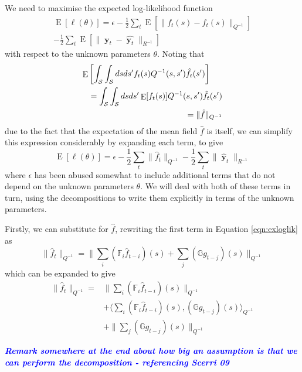 \documentclass{IEEEtran}
\newcommand{\todo}[1]{\textsf{\emph{\textbf{\textcolor{blue}{#1}}}}}
\newcommand{\inner}[3]{\langle#1,#2\rangle_{#3}}
\newcommand{\dist}[2]{\|#1\|_{#2}}
\DeclareMathOperator{\E}{E}
\DeclareMathOperator{\yvec}{\mathbf{y}}
\begin{document}
We need to maximise the expected log-likelihood function
\begin{equation}
	\begin{split}
	\E[\ell(\theta)] = \epsilon - \frac{1}{2}\sum_t\E[\dist{f_t(s) - \hat{f}_t(s)}{Q^{-1}}]  \\
	- \frac{1}{2}\sum_t\E[\dist{\yvec_t-\hat{\yvec_t}}{R^{-1}}]
	\end{split}
\end{equation}
with respect to the unknown parameters $\theta$. Noting that 
\begin{eqnarray}
	\lefteqn{\E\left[\int_\mathcal{S}\int_\mathcal{S}ds ds' f_t(s) Q^{-1}(s,s') \hat{f}_t(s')\right] } \nonumber \\ 
		&& = \int_\mathcal{S}\int_\mathcal{S}ds ds' \E[f_t(s)] Q^{-1}(s,s') \hat{f}_t(s') \\
		&& = \dist{\hat{f}}{Q^{-1}}
\end{eqnarray}
due to the fact that the expectation of the mean field $\hat{f}$ is itself, we can simplify this expression considerably by expanding each term, to give
\begin{equation}
	\label{eqn:exloglik}
	\E[\ell(\theta)] = \epsilon  - 
	\frac{1}{2}\sum_t \dist{\hat{f}_t}{Q^{-1}}
	- \frac{1}{2}\sum_t \dist{\hat{\yvec}_t}{R^{-1}}
\end{equation}
where $\epsilon$ has been abused somewhat to include additional terms that do not depend on the unknown parameters $\theta$. We will deal with both of these terms in turn, using the decompositions to write them explicitly in terms of the unknown parameters.

Firstly, we can substitute for $\hat{f}$, rewriting the first term in Equation \ref{eqn:exloglik} as
\begin{equation}
	\dist{\hat{f}_t}{Q^{-1}} = \dist{\sum_i(\mathbb{F}_i\hat{f}_{t-i})(s) + \sum_j(\mathbb{G}g_{t-j})(s)}{Q^{-1}}
\end{equation}
which can be expanded to give
\begin{equation}
	\begin{split}
	\dist
		{\hat{f}_t}
		{Q^{-1}} 
	= & \dist
		{\sum_i(\mathbb{F}_i\hat{f}_{t-i})(s)}
		{Q^{-1}} \\
	& + \inner
		{\sum_i(\mathbb{F}_i\hat{f}_{t-i})(s)}
		{(\mathbb{G}g_{t-j})(s)}
		{Q^{-1}} \\
	& + \dist
		{\sum_j(\mathbb{G}g_{t-j})(s)}
		{Q^{-1}}
	\end{split}
\end{equation}

\todo{Remark somewhere at the end about how big an assumption is that we can perform the decomposition - referencing Scerri 09}
\end{document}
